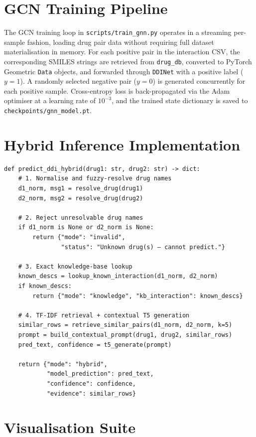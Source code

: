 \documentclass[12pt,a4paper,oneside]{report}
\begin{document}
\section{GCN Training Pipeline}

The GCN training loop in \texttt{scripts/train\_gnn.py} operates in a streaming per-sample
fashion, loading drug pair data without requiring full dataset materialisation in memory.
For each positive pair in the interaction CSV, the corresponding SMILES strings are retrieved
from \texttt{drug\_db}, converted to PyTorch Geometric \texttt{Data} objects, and forwarded
through \texttt{DDINet} with a positive label ($y=1$). A randomly selected negative pair
($y=0$) is generated concurrently for each positive sample. Cross-entropy loss is
back-propagated via the Adam optimiser at a learning rate of $10^{-3}$, and the trained
state dictionary is saved to \texttt{checkpoints/gnn\_model.pt}.

\section{Hybrid Inference Implementation}

\begin{lstlisting}[caption={Core Hybrid Prediction Function (predict.py)}]
def predict_ddi_hybrid(drug1: str, drug2: str) -> dict:
    # 1. Normalise and fuzzy-resolve drug names
    d1_norm, msg1 = resolve_drug(drug1)
    d2_norm, msg2 = resolve_drug(drug2)

    # 2. Reject unresolvable drug names
    if d1_norm is None or d2_norm is None:
        return {"mode": "invalid",
                "status": "Unknown drug(s) — cannot predict."}

    # 3. Exact knowledge-base lookup
    known_descs = lookup_known_interaction(d1_norm, d2_norm)
    if known_descs:
        return {"mode": "knowledge", "kb_interaction": known_descs}

    # 4. TF-IDF retrieval + contextual T5 generation
    similar_rows = retrieve_similar_pairs(d1_norm, d2_norm, k=5)
    prompt = build_contextual_prompt(drug1, drug2, similar_rows)
    pred_text, confidence = t5_generate(prompt)

    return {"mode": "hybrid",
            "model_prediction": pred_text,
            "confidence": confidence,
            "evidence": similar_rows}
\end{lstlisting}

\section{Visualisation Suite}
\end{document}
